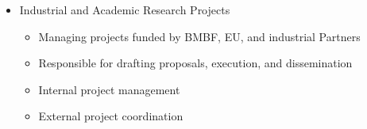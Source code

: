 {\begin{itemize}
\begin{itemize}
      \item Layout
      \item Measurements and characterization
    \end{itemize}
    \item Industrial and Academic Research Projects 
    \begin{itemize}
        \item Managing projects funded by BMBF, EU, and industrial Partners
        \item Responsible for drafting proposals, execution,  and dissemination
        \item Internal project management
        \item External project coordination
      \end{itemize}
  \end{itemize}
}
